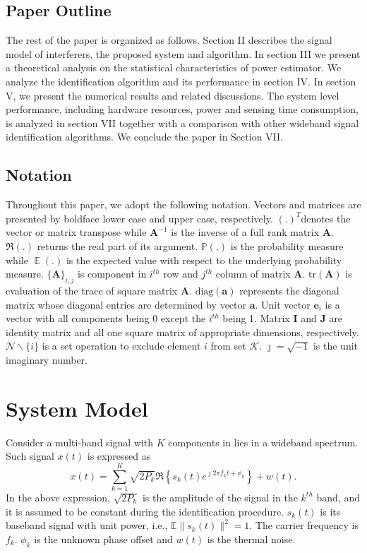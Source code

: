 \documentclass{IEEEtran}
\DeclareMathOperator{\E}{\mathbb{E}}
\begin{document}
\subsection{Paper Outline}
The rest of the paper is organized as follows. Section II describes the signal model of interferers, the proposed system and algorithm. In section III we present a theoretical analysis on the statistical characteristics of power estimator. We analyze the identification algorithm and its performance in section IV. In section V, we present the numerical results and related discussions. The system level performance, including hardware resources, power and sensing time consumption, is analyzed in section VII together with a comparison with other wideband signal identification algorithms. We conclude the paper in Section VII.

\subsection{Notation}
Throughout this paper, we adopt the following notation. Vectors and matrices are presented by boldface lower case and upper case, respectively.  $(.)^T$denotes the vector or matrix transpose while $\mathbf{A}^{-1}$ is the inverse of a full rank matrix $\mathbf{A}$. $\Re (.)$ returns the real part of its argument. $\mathbb{P}(.)$ is the probability measure while $\E(.)$ is the expected value with respect to the underlying probability measure. $\{\mathbf{A}\}_{i,j}$ is component in $i^{th}$ row and $j^{th}$ column of matrix $\mathbf{A}$. $\mathrm{tr}(\mathbf{A})$ is evaluation of the trace of square matrix $\mathbf{A}$. $\mathrm{diag}(\mathbf{a})$ represents the diagonal matrix whose diagonal entries are determined by vector $\mathbf{a}$. Unit vector $\mathbf{e}_i$ is a vector with all components being 0 except the $i^{th}$ being 1. Matrix $\mathbf{I}$ and $\mathbf{J}$ are identity matrix and all one square matrix of appropriate dimensions, respectively. $\mathcal{N} \backslash \{i\}$ is a set operation to exclude element $i$ from set $\mathcal{K}$. $\jmath = \sqrt{-1}$ is the unit imaginary number.

%

\section{System Model}
\label{sec:Model}
Consider a multi-band signal with $K$ components in lies in a wideband spectrum. Such signal $x(t)$ is expressed as
\begin{equation}
\label{eq:interferers_model}
x(t) = \sum\limits_{k=1}^{K} \sqrt{2P_{k}} \Re \left\{s_{k}(t) e ^{\jmath 2\pi f_{k}t+\phi_{k}}\right\} +w(t).
\end{equation}
In the above expression, $\sqrt{2P_{k}}$ is the amplitude of the signal in the $k^{th}$ band, and it is assumed to be constant during the identification procedure. $s_{k}(t)$ is its baseband signal with unit power, i.e., $\mathbb{E}\|s_k(t)\|^2=1$. The carrier frequency is $f_{k}$. $\phi_{k}$ is the unknown phase offset and $w(t)$ is the thermal noise. 
\end{document}
